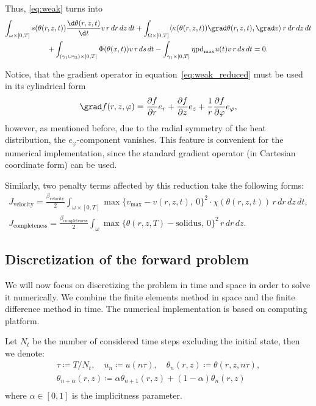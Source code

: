 Thus, \eqref{eq:weak} turns into
\begin{multline} \label{eq:weak_reduced}
	\int_{\omega \times [0,T]} s(\theta(r,z,t)) \frac{\d \theta(r,z,t)}{\d t} v\, r\, dr\, dz\, dt
	+
	\int_{\Omega \times [0,T]} \langle \kappa(\theta(r,z,t)) \grad\theta(r,z,t), \grad v \rangle \, r\, dr\, dz\, dt \\
	+
	\int_{(\gamma_1 \cup \gamma_2) \times [0,T]} \Phi(\theta(x,t)) v\, r\, ds\, dt -
	\int_{\gamma_1 \times [0,T]} \eta \text{pd}_{\max} u(t) v\, r\, ds\, dt = 0.
\end{multline}

Notice, that the gradient operator in equation~\eqref{eq:weak_reduced} must be used in its cylindrical form
\begin{equation*}
	\grad f(r,z,\varphi) =
		\frac{\partial f}{\partial r} e_r
		+
		\frac{\partial f}{\partial z} e_z
		+
		\frac{1}{r} \frac{\partial f}{\partial \varphi} e_{\varphi},
\end{equation*}
however, as mentioned before, due to the radial symmetry of the heat distribution, the $e_{\varphi}$-component vanishes. This feature is convenient for the numerical implementation, since the standard gradient operator (in Cartesian coordinate form) can be used.

Similarly, two penalty terms affected by this reduction take the following forms:
\begin{eqnarray}
	\label{eq:J_velocity_r}
	J_\text{velocity} =
	\frac{\beta_\text{velocity}}{2}
	\int_{\omega \times [0,T]} \max \{ v_{\max} - v(r,z,t),\ 0 \}^2 \cdot \chi(\theta(r,z,t))\, r\, dr\, dz\, dt, \\
	\label{eq:J_completeness_r}
	J_\text{completeness} =
	\frac{\beta_\text{completeness}}{2} \int_{\omega} \max\{ \theta(r,z,T) - \text{solidus},\ 0 \}^2\, r\, dr\, dz.
\end{eqnarray}


\subsection{Discretization of the forward problem}

We will now focus on discretizing the problem in time and space in order to solve it numerically. We combine the finite elements method in space and the finite difference method in time. The numerical implementation is based on \fenics computing platform.

Let $N_t$ be the number of considered time steps excluding the initial state, then we denote:
\begin{equation}
\begin{split}
	\tau \coloneqq T/N_t, \quad	u_n \coloneqq u(n\tau),	\quad \theta_n(r,z) \coloneqq \theta(r,z,n\tau), \\
	\theta_{n+\alpha}(r,z) \coloneqq \alpha\theta_{n+1}(r,z) + (1-\alpha)\theta_n(r,z)\\
\end{split}
\end{equation}
where $\alpha \in [0,1]$ is the implicitness parameter.

